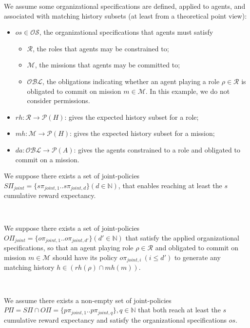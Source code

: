 \begin{proofoutline}
    \noindent We assume some organizational specifications are defined, applied to agents, and associated with matching history subsets (at least from a theoretical point view):
    \begin{itemize}
        \item $os \in \mathcal{OS}$, the organizational specifications that agents must satisfy
              \begin{itemize}
                  \item $\mathcal{R}$, the roles that agents may be constrained to;
                  \item $\mathcal{M}$, the missions that agents may be committed to;
                  \item $\mathcal{OBL}$, the obligations indicating whether an agent playing a role $\rho \in \mathcal{R}$ is obligated to commit on mission $m \in \mathcal{M}$. In this example, we do not consider permissions.
              \end{itemize}
        \item $rh: \mathcal{R} \rightarrow \mathcal{P}(H)$: gives the expected history subset for a role;
        \item $mh: \mathcal{M} \rightarrow \mathcal{P}(H)$: gives the expected history subset for a mission;
        \item $da: \mathcal{OBL} \rightarrow \mathcal{P}(A)$: gives the agents constrained to a role and obligated to commit on a mission.
    \end{itemize}

    \noindent We suppose there exists a set of joint-policies $S\Pi_{joint} = \{s\pi_{joint,1}.. s\pi_{joint,d}\} \allowbreak (d \in \mathbb{N})$, that enables reaching at least the $s$ cumulative reward expectancy.

    \

    \noindent We suppose there exists a set of joint-policies $O\Pi_{joint} = \{o\pi_{joint,1}.. o\pi_{joint,d'}\} (d' \in \mathbb{N})$ that satisfy the applied organizational specifications, so that an agent playing role $\rho \in \mathcal{R}$ and obligated to commit on mission $m \in \mathcal{M}$ should have its policy $o\pi_{joint,i} \ (i \leq d')$ to generate any matching history $h \in (rh(\rho) \cap mh(m))$.

    \

    \noindent We assume there exists a non-empty set of joint-policies $P\Pi = S\Pi \cap O\Pi \allowbreak = \{p\pi_{joint,1}..p\pi_{joint,q}\}, q \in \mathbb{N}$ that both reach at least the $s$ cumulative reward expectancy and satisfy the organizational specifications $os$.


\end{proofoutline}
